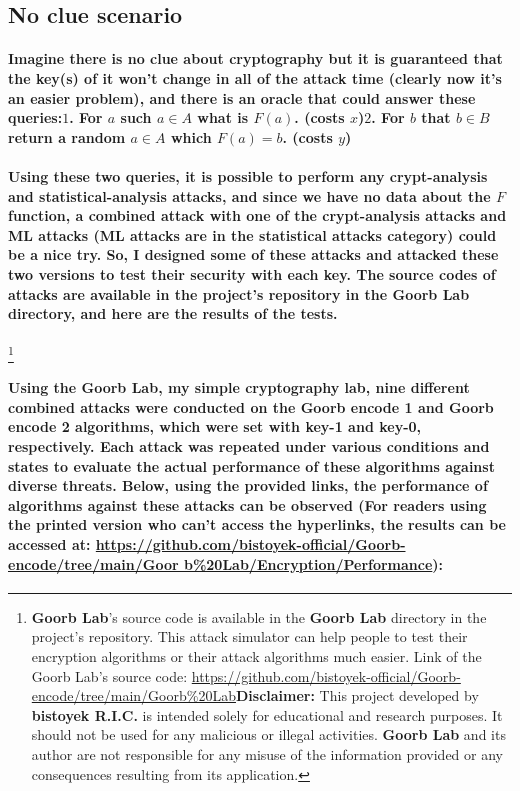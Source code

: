 \documentclass[oneside]{book}
\newcommand{\myparagraph}[1]{\paragraph{\textnormal{#1}}}
\begin{document}
\subsection{No clue scenario}

\myparagraph{
Imagine there is no clue about cryptography but it is guaranteed that the key(s) of it won't change in all of the attack time (clearly now it's an easier problem), and there is an oracle that could answer these queries:\newline \newline$1$. For $a$ such $a \in A$ what is $F(a)$. (costs $x$)\newline$2$. For $b$ that $b \in B$ return a random $a \in A$ which $F(a) = b$. (costs $y$)
}

\myparagraph{
Using these two queries, it is possible to perform any crypt-analysis and statistical-analysis attacks, and since we have no data about the $F$ function, a combined attack with one of the crypt-analysis attacks and ML attacks (ML attacks are in the statistical attacks category) could be a nice try. So, I designed some of these attacks and attacked these two versions to test their security with each key. The source codes of attacks are available in the project's repository in the \textbf{Goorb Lab} directory, and here are the results of the tests.
}
\footnote{\textbf{Goorb Lab}'s source code is available in the \textbf{Goorb Lab} directory in the project's repository. This attack simulator can help people to test their encryption algorithms or their attack algorithms much easier. \newline Link of the Goorb Lab's source code: \newline \href{https://github.com/bistoyek-official/Goorb-encode/tree/main/Goorb\%20Lab}{https://github.com/bistoyek-official/Goorb-encode/tree/main/Goorb\%20Lab}\newline \textbf{Disclaimer:} This project developed by \textbf{bistoyek R.I.C.} is intended solely for educational and research purposes. It should not be used for any malicious or illegal activities. \textbf{Goorb Lab} and its author are not responsible for any misuse of the information provided or any consequences resulting from its application.}

\myparagraph{
Using the \textbf{Goorb Lab}, my simple cryptography lab, nine different combined attacks were conducted on the \textbf{Goorb encode 1} and \textbf{Goorb encode 2} algorithms, which were set with \textbf{key-1} and \textbf{key-0}, respectively. Each attack was repeated under various conditions and states to evaluate the actual performance of these algorithms against diverse threats. Below, using the provided links, the performance of algorithms against these attacks can be observed (For readers using the printed version who can't access the hyperlinks, the results can be accessed at: \href{https://github.com/bistoyek-official/Goorb-encode/tree/main/Goorb\%20Lab/Encryption/Performance}{https://github.com/bistoyek-official/Goorb-encode/tree/main/Goor \newline b\%20Lab/Encryption/Performance}):
}
\end{document}
